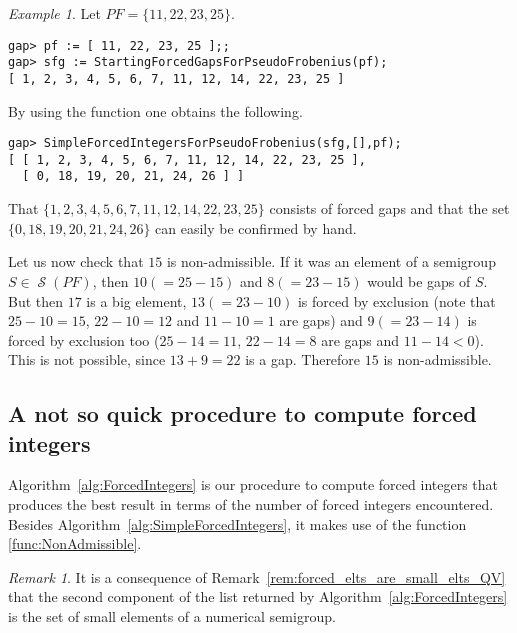 \documentclass[11pt]{amsart}
\theoremstyle{remark}
\newtheorem{example}[theorem]{Example}
\newtheorem{remark}[theorem]{Remark}
\begin{document}
\begin{example}\label{example:non_admissible}
Let $PF=\{11, 22, 23, 25\}$. 
\begin{verbatim}
gap> pf := [ 11, 22, 23, 25 ];;
gap> sfg := StartingForcedGapsForPseudoFrobenius(pf);                    
[ 1, 2, 3, 4, 5, 6, 7, 11, 12, 14, 22, 23, 25 ]
\end{verbatim}
By using the function \SimpleForcedIntegers one obtains the following.
\begin{verbatim}
gap> SimpleForcedIntegersForPseudoFrobenius(sfg,[],pf);
[ [ 1, 2, 3, 4, 5, 6, 7, 11, 12, 14, 22, 23, 25 ], 
  [ 0, 18, 19, 20, 21, 24, 26 ] ]
\end{verbatim}
That $\{1, 2, 3, 4, 5, 6, 7, 11, 12, 14, 22, 23, 25\}$ consists of forced gaps and that the set $\{0, 18, 19, 20, 21, 24, 26\}$ can easily be confirmed by hand.

Let us now check that $15$ is non-admissible. If it was an element of a semigroup $S\in\operatorname{\mathcal{S}}(PF)$, then $10(=25-15)$ and $8(=23-15)$ would be gaps of $S$. But then $17$ is a big element, $13 (= 23-10)$ is forced by exclusion (note that $25-10=15$, $22-10=12$ and $11-10=1$ are gaps) and $9(=23-14)$ is forced by exclusion too ($25-14=11$, $22-14=8$ are gaps and $11-14<0$). This is not possible, since $13+9=22$ is a gap. Therefore $15$ is non-admissible.
\end{example}
\subsection{A not so quick procedure to compute forced integers}
\label{subsec:procedure_forced_integers}
Algorithm~\ref{alg:ForcedIntegers} is our procedure to compute forced integers that produces the best result in terms of the number of forced integers encountered. Besides Algorithm~\ref{alg:SimpleForcedIntegers}, it makes use of the function \ref{func:NonAdmissible}.
\begin{remark}\label{rem:forced_elts_are_small_elts}
It is a consequence of Remark~\ref{rem:forced_elts_are_small_elts_QV} that the second component of the list returned by Algorithm~\ref{alg:ForcedIntegers} is the set of small elements of a numerical semigroup.
\end{remark}
\end{document}

